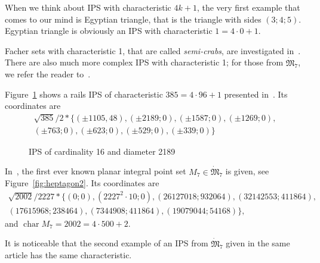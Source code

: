\documentclass[a4paper,14pt]{article} %
\theoremstyle{plain}
\theoremstyle{definition}
\DeclareMathOperator{\chr}{char}
\begin{document}
When we think about IPS with characteristic $4k+1$,
the very first example that comes to our mind is Egyptian triangle,
that is the triangle with sides $(3;4;5)$.
Egyptian triangle is obviously an IPS with characteristic $1 = 4 \cdot 0 +1$.

Facher sets with characteristic 1, that are called \emph{semi-crabs},
are investigated in~\cite{antonov2008maximal}.
There are also much more complex IPS with characteristic 1;
for those from $\dot{\mathfrak{M}}_7$, we refer the reader to~\cite{kurz2013constructing}.

Figure~\ref{fig:rails_2_14} shows a rails IPS of characteristic $385 = 4 \cdot 96 + 1$ presented in~\cite{avdeev2019particular}.
Its coordinates are
\begin{multline}
	\sqrt{385}/{2} * \{ (\pm 1105, 48),
	(\pm 2189 ; 0),
	(\pm 1587 ; 0),
	(\pm 1269 ; 0),
	\\
	(\pm 763 ; 0),
	(\pm 623 ; 0),
	(\pm 529 ; 0),
	(\pm 339 ; 0)\}
\end{multline}

\begin{figure}
\caption{IPS of cardinality 16 and diameter 2189}
\label{fig:rails_2_14}
\end{figure}

In~\cite{kreisel2008heptagon}, the first ever known
planar integral point set $M_7 \in \dot{\mathfrak{M}}_7$ is given,
see Figure~\ref{fig:heptagon2}.
Its coordinates are
\begin{multline}
\sqrt{2002}/2227 * \{ (0;0), (2227^2\cdot10;0), (26127018;932064), (32 142 553; 411 864),
\\
	 (17615968;238464), (7 344 908;411 864), (19079044; 54168)\}
	 ,
\end{multline}
and
$
	\chr M_7 = 2002 = 4\cdot 500 + 2
$.

It is noticeable that the second example of an IPS from $\dot{\mathfrak{M}}_7$
given in the same article has the same characteristic.
\end{document}
